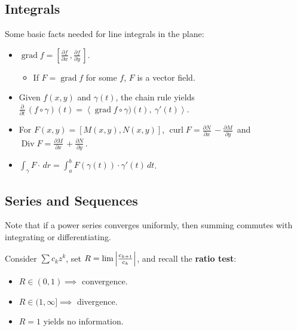 \hypertarget{integrals}{%
\subsection{Integrals}\label{integrals}}

\begin{remark}

Some basic facts needed for line integrals in the plane:

\begin{itemize}
\tightlist
\item
  \(\operatorname{grad}f = {\left[ { {\frac{\partial f}{\partial x}\,}, {\frac{\partial f}{\partial y}\,} } \right]}\).

  \begin{itemize}
  \tightlist
  \item
    If \(F = \operatorname{grad}f\) for some \(f\), \(F\) is a vector
    field.
  \end{itemize}
\item
  Given \(f(x, y)\) and \(\gamma(t)\), the chain rule yields
  \({\frac{\partial }{\partial t}\,} (f\circ \gamma)(t) = {\left\langle { \operatorname{grad}f\circ \gamma)(t)},~{\gamma'(t)} \right\rangle}\).
\item
  For \(F(x, y) = {\left[ {M(x, y), N(x, y)} \right]}\),
  \(\operatorname{curl}F = {\frac{\partial N}{\partial x}\,} - {\frac{\partial M}{\partial y}\,}\)
  and
  \(\operatorname{Div}F = {\frac{\partial M}{\partial x}\,} + {\frac{\partial N}{\partial y}\,}\).
\item
  \(\int_\gamma F\cdot \,dr= \int_a^b F(\gamma(t))\cdot \gamma'(t) \,dt\).
\end{itemize}

\end{remark}

\hypertarget{series-and-sequences}{%
\subsection{Series and Sequences}\label{series-and-sequences}}

\begin{remark}

Note that if a power series converges uniformly, then summing commutes
with integrating or differentiating.

\end{remark}

\begin{proposition}

Consider \(\sum c_k z^k\), set
\(R = \lim {\left\lvert {c_{k+1} \over c_k} \right\rvert}\), and recall
the \textbf{ratio test}:

\begin{itemize}
\tightlist
\item
  \(R\in (0, 1) \implies\) convergence.
\item
  \(R\in (1, \infty] \implies\) divergence.
\item
  \(R=1\) yields no information.
\end{itemize}

\end{proposition}

